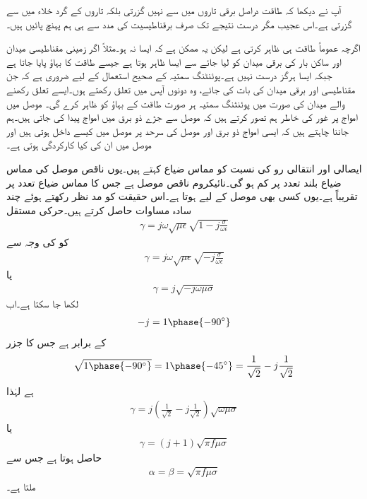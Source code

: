 آپ نے دیکھا کہ طاقت دراصل برقی تاروں میں سے نہیں گزرتی بلکہ تاروں کے گرد خلاء میں سے گزرتی ہے۔اس عجیب مگر درست نتیجے تک صرف برقناطیسیت کی مدد سے ہی ہم پہنچ پائیں ہیں۔ 

اگرچہ  عموماً طاقت ہی ظاہر کرتی ہے لیکن یہ ممکن ہے کہ ایسا نہ ہو۔مثلاً اگر زمینی مقناطیسی میدان  اور ساکن بار کی برقی میدان  کو لیا جائے  سے ایسا ظاہر ہوتا ہے جیسے طاقت کا بہاؤ پایا جاتا ہے جبکہ ایسا ہرگز درست نہیں ہے۔پوئنٹنگ سمتیہ کے صحیح استعمال کے لیے ضروری ہے کہ جن مقناطیسی اور برقی میدان کی بات کی جائے، وہ دونوں آپس میں تعلق رکھتے ہوں۔ایسے تعلق رکھنے والے میدان کی صورت میں پوئنٹنگ  سمتیہ ہر صورت طاقت کے بہاؤ کو ظاہر کرے گی۔ 
موصل میں امواج پر غور کی خاطر ہم تصور کرتے ہیں کہ موصل سے جڑے ذو برق میں امواج پیدا کی جاتی ہیں۔ہم جاننا چاہتے ہیں کہ ایسی امواج ذو برق اور موصل کی سرحد پر موصل میں کیسے داخل ہوتی ہیں اور موصل میں ان کی کیا کارکردگی ہوتی ہے۔

ایصالی اور انتقالی رو کی نسبت   کو مماس ضیاع کہتے ہیں۔یوں ناقص موصل کی مماس ضیاع بلند تعدد پر کم ہو گی۔نائیکروم ناقص موصل ہے جس کا مماس ضیاع  تعدد پر  تقریباً  ہے۔یوں کسی بھی موصل کے لیے  ہوتا ہے۔اس حقیقت کو مد نظر رکھتے ہوئے چند سادہ مساوات حاصل کرتے ہیں۔حرکی مستقل
\begin{align*}
\gamma=j \omega \sqrt{\mu \epsilon} \sqrt{1-j \frac{\sigma}{\omega \epsilon}}
\end{align*}
کو  کی وجہ سے 
\begin{align*}
\gamma=j \omega \sqrt{\mu \epsilon}\sqrt{-j \frac{\sigma}{\omega \epsilon}}
\end{align*}
یا
\begin{align*}
\gamma=j \sqrt{-j \omega \mu \sigma}
\end{align*}
لکھا جا سکتا ہے۔اب
\begin{align*}
-j = 1\phase{-90^\circ}
\end{align*}
کے برابر ہے جس کا جزر
\begin{align*}
\sqrt{1\phase{-90^\circ}}=1\phase{-45^\circ}=\frac{1}{\sqrt{2}}-j \frac{1}{\sqrt{2}}
\end{align*}
ہے لہٰذا
\begin{align*}
\gamma=j \left(\frac{1}{\sqrt{2}}-j \frac{1}{\sqrt{2}}\right)\sqrt{\omega \mu \sigma}
\end{align*}
یا
\begin{align}
\gamma=\left(j+1 \right)\sqrt{\pi f \mu \sigma}
\end{align}
حاصل ہوتا ہے جس سے
\begin{align}
\alpha=\beta=\sqrt{\pi f \mu \sigma}
\end{align}
ملتا ہے۔

